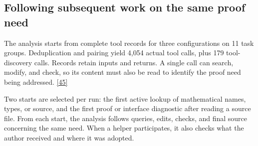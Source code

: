 \subsection[Following subsequent work on the same proof need]{\texorpdfstring{\protect\hypertarget{section-5-1}{}Following subsequent work on the same proof need}{Following subsequent work on the same proof need}}
The analysis starts from complete tool records for three configurations on 11 task groups. Deduplication and pairing yield 4,054 actual tool calls, plus 179 tool-discovery calls. Records retain inputs and returns. A single call can search, modify, and check, so its content must also be read to identify the proof need being addressed. \hyperlink{ref-45}{\mbox{[45]}}

Two starts are selected per run: the first active lookup of mathematical names, types, or source, and the first proof or interface diagnostic after reading a source file. From each start, the analysis follows queries, edits, checks, and final source concerning the same need. When a helper participates, it also checks what the author received and where it was adopted.

